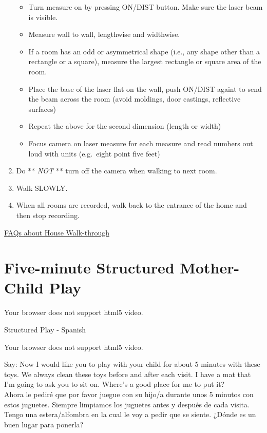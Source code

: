 \documentclass[
  12pt,
]{book}
\providecommand{\tightlist}{%
  \setlength{\itemsep}{0pt}\setlength{\parskip}{0pt}}
\begin{document}
\begin{enumerate}
  \begin{itemize}
  \tightlist
  \item
    Turn measure on by pressing ON/DIST button. Make sure the laser beam is visible.
  \item
    Measure wall to wall, lengthwise and widthwise.
  \item
    If a room has an odd or asymmetrical shape (i.e., any shape other than a rectangle or a square), measure the largest rectangle or square area of the room.
  \item
    Place the base of the laser flat on the wall, push ON/DIST againt to send the beam across the room (avoid moldings, door castings, reflective surfaces)
  \item
    Repeat the above for the second dimension (length or width)
  \item
    Focus camera on laser measure for each measure and read numbers out loud with units (e.g.~eight point five feet)
  \end{itemize}
\item
  Do ** \emph{NOT} ** turn off the camera when walking to next room.
\item
  Walk SLOWLY.
\item
  When all rooms are recorded, walk back to the entrance of the home and then stop recording.
\end{enumerate}

\protect\hyperlink{faqs_walkthrough}{FAQs about House Walk-through}

\hypertarget{five-minute-structured-mother-child-play}{%
\section{Five-minute Structured Mother-Child Play}\label{five-minute-structured-mother-child-play}}

Your browser does not support html5 video.

Structured Play - Spanish

Your browser does not support html5 video.

Say: Now I would like you to play with your child for about 5 minutes with these toys. We always clean these toys before and after each visit. I have a mat that I'm going to ask you to sit on. Where's a good place for me to put it?
    Ahora le pediré que por favor juegue con su hijo/a durante unos 5 minutos con estos juguetes. Siempre limpiamos los juguetes antes y después de cada visita. Tengo una estera/alfombra en la cual le voy a pedir que se siente. ¿Dónde es un buen lugar para ponerla?
\end{document}
